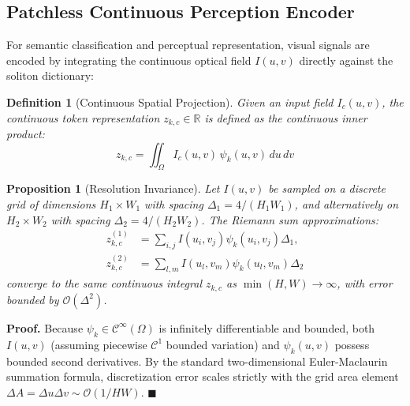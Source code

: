 \documentclass[10pt,twocolumn]{article}
\newtheorem{proposition}{Proposition}
\newtheorem{definition}{Definition}
\begin{document}
\subsection{Patchless Continuous Perception Encoder}
For semantic classification and perceptual representation, visual signals are encoded by integrating the continuous optical field $I(u, v)$ directly against the soliton dictionary:

\begin{definition}[Continuous Spatial Projection]
Given an input field $I_c(u, v)$, the continuous token representation $z_{k, c} \in \mathbb{R}$ is defined as the continuous inner product:
\begin{equation}
    z_{k, c} = \iint_\Omega I_c(u, v) \, \psi_k(u, v) \, du \, dv
    \label{eq:projection}
\end{equation}
\end{definition}

\begin{proposition}[Resolution Invariance]
Let $I(u, v)$ be sampled on a discrete grid of dimensions $H_1 \times W_1$ with spacing $\Delta_1 = 4/(H_1 W_1)$, and alternatively on $H_2 \times W_2$ with spacing $\Delta_2 = 4/(H_2 W_2)$. The Riemann sum approximations:
\begin{align}
    z_{k, c}^{(1)} &= \sum_{i, j} I(u_i, v_j) \psi_k(u_i, v_j) \Delta_1, \\
    z_{k, c}^{(2)} &= \sum_{l, m} I(u_l, v_m) \psi_k(u_l, v_m) \Delta_2
\end{align}
converge to the same continuous integral $z_{k, c}$ as $\min(H, W) \to \infty$, with error bounded by $\mathcal{O}(\Delta^2)$.
\end{proposition}
\textbf{Proof.} Because $\psi_k \in \mathcal{C}^\infty(\Omega)$ is infinitely differentiable and bounded, both $I(u, v)$ (assuming piecewise $\mathcal{C}^1$ bounded variation) and $\psi_k(u, v)$ possess bounded second derivatives. By the standard two-dimensional Euler-Maclaurin summation formula, discretization error scales strictly with the grid area element $\Delta A = \Delta u \Delta v \sim \mathcal{O}(1/HW)$. $\blacksquare$
\end{document}
